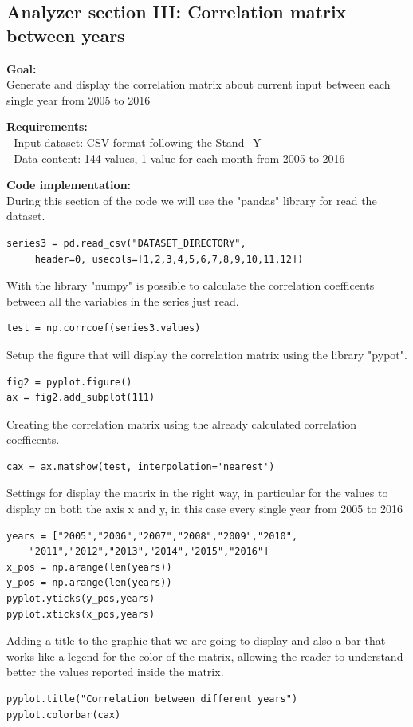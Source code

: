 \newpage
\subsection{Analyzer section III: Correlation matrix between years}

\textbf{Goal:}\\
Generate and display the correlation matrix about current input between each single year from 2005 to 2016

\textbf{Requirements:}\\
- Input dataset: CSV format following the Stand\_Y \\
- Data content: 144 values, 1 value for each month from 2005 to 2016

\textbf{Code implementation:}\\
During this section of the code we will use the "pandas" library for read the dataset.
\begin{lstlisting}
series3 = pd.read_csv("DATASET_DIRECTORY",
	 header=0, usecols=[1,2,3,4,5,6,7,8,9,10,11,12])
\end{lstlisting}

With the library "numpy" is possible to calculate the correlation coefficents between all the variables in the series just read.
\begin{lstlisting}
test = np.corrcoef(series3.values)
\end{lstlisting}

Setup the figure that will display the correlation matrix using the library "pypot".
\begin{lstlisting}
fig2 = pyplot.figure()
ax = fig2.add_subplot(111)
\end{lstlisting}

Creating the correlation matrix using the already calculated correlation coefficents.
\begin{lstlisting}
cax = ax.matshow(test, interpolation='nearest')
\end{lstlisting}

Settings for display the matrix in the right way, in particular for the values to display on both the axis x and y, in this case every single year from 2005 to 2016
\begin{lstlisting}
years = ["2005","2006","2007","2008","2009","2010",
	"2011","2012","2013","2014","2015","2016"]
x_pos = np.arange(len(years))
y_pos = np.arange(len(years))
pyplot.yticks(y_pos,years)
pyplot.xticks(x_pos,years)
\end{lstlisting}
\newpage
Adding a title to the graphic that we are going to display and also a bar that works like a legend for the color of the matrix, allowing the reader to understand better the values reported inside the matrix.
\begin{lstlisting}
pyplot.title("Correlation between different years")
pyplot.colorbar(cax)
\end{lstlisting}


